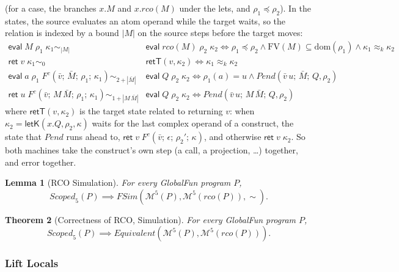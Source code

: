 \documentclass[10pt]{article}
\theoremstyle{acmplain}
\newtheorem{theorem}{Theorem}[section]
\newtheorem{lemma}[theorem]{Lemma}
\newcommand{\key}[1]{\mathsf{#1}}
\newcommand{\pass}[1]{\mathit{#1}}
\newcommand{\FV}{\mathrm{FV}}
\newcommand{\ev}[3]{\key{eval}\;#1\;#2\;#3}
\newcommand{\rt}[2]{\key{ret}\;#1\;#2}
\newcommand{\Mach}[1]{\mathcal{M}^{#1}}
\newcommand{\Equiv}{\mathit{Equivalent}}
\newcommand{\FSim}{\mathit{FSim}}
\newcommand{\Kf}[2]{\key{#1}(#2)}
\newcommand{\approxk}{\approx_k}
\begin{document}
(for a case, the branches $x.M$ and $x.\pass{rco}(M)$ under the lets, and
$\rho_1 \preceq \rho_2$). In the states, the source evaluates an atom
operand while the target waits, so the relation is indexed by a bound
$|M|$ on the source steps before the target moves:
\begin{align*}
  \ev{M}{\rho_1}{\kappa_1} \sim_{|M|} {}& \ev{\pass{rco}(M)}{\rho_2}{\kappa_2}
    \iff \rho_1 \preceq \rho_2 \land \FV(M) \subseteq \mathrm{dom}(\rho_1) \land \kappa_1 \approxk \kappa_2 \\
  \rt{v}{\kappa_1} \sim_0 {}& \key{retT}(v, \kappa_2) \iff \kappa_1 \approxk \kappa_2 \\
  \ev{a}{\rho_1}{F^c(\bar{v};\, \bar{M};\, \rho_1;\, \kappa_1)} \sim_{2 + |\bar{M}|} {}& \ev{Q}{\rho_2}{\kappa_2}
    \iff \rho_1(a) = u \land \mathit{Pend}(\bar{v}\, u;\, \bar{M};\, Q, \rho_2) \\
  \rt{u}{F^c(\bar{v};\, M\,\bar{M};\, \rho_1;\, \kappa_1)} \sim_{1 + |M\,\bar{M}|} {}& \ev{Q}{\rho_2}{\kappa_2}
    \iff \mathit{Pend}(\bar{v}\, u;\, M\,\bar{M};\, Q, \rho_2)
\end{align*}
where $\key{retT}(v, \kappa_2)$ is the target state related to returning
$v$: when $\kappa_2 = \Kf{letK}{x.Q, \rho_2, \kappa}$ waits for the last
complex operand of a construct, the state that $\mathit{Pend}$ runs ahead
to, $\rt{v}{F^c(\bar{v};\, \epsilon;\, \rho_2';\, \kappa)}$, and otherwise
$\rt{v}{\kappa_2}$. So both machines take the construct's own step (a call,
a projection, \ldots) together, and error together.

\begin{lemma}[RCO Simulation]\label{lem:rco-fsim}
For every GlobalFun program $P$,
\[
  \mathit{Scoped}_5(P) \implies \FSim(\Mach{5}(P), \Mach{5}(\pass{rco}(P)), \sim) .
\]
\end{lemma}

\begin{theorem}[Correctness of RCO, Simulation]\label{thm:rco-sim}
For every GlobalFun program $P$,
\[
  \mathit{Scoped}_5(P) \implies \Equiv(\Mach{5}(P), \Mach{5}(\pass{rco}(P))) .
\]
\end{theorem}

\subsubsection{Lift Locals}\label{sec:sim-lift}
\end{document}
